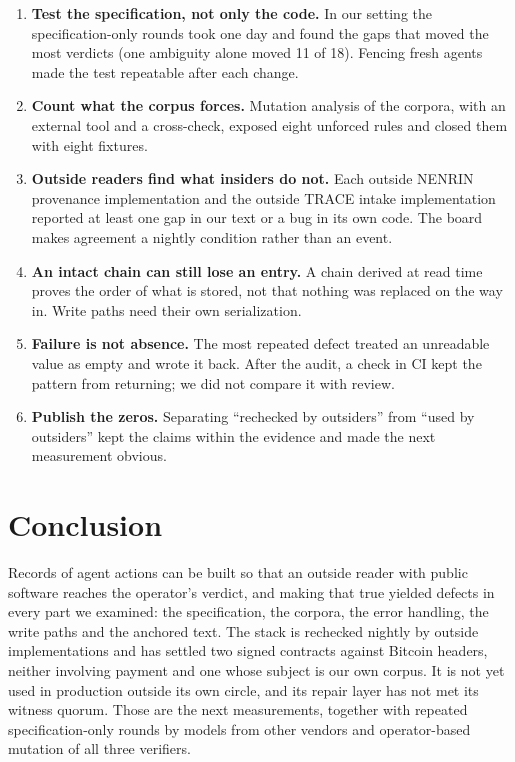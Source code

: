 \documentclass[11pt,a4paper]{article}
\begin{document}
\begin{enumerate}[label=L\arabic*.]
\item \textbf{Test the specification, not only the code.} In our setting the specification-only rounds took one day and found the gaps that moved the most verdicts (one ambiguity alone moved 11 of 18). Fencing fresh agents made the test repeatable after each change.
\item \textbf{Count what the corpus forces.} Mutation analysis of the corpora, with an external tool and a cross-check, exposed eight unforced rules and closed them with eight fixtures.
\item \textbf{Outside readers find what insiders do not.} Each outside NENRIN provenance implementation and the outside TRACE intake implementation reported at least one gap in our text or a bug in its own code. The board makes agreement a nightly condition rather than an event.
\item \textbf{An intact chain can still lose an entry.} A chain derived at read time proves the order of what is stored, not that nothing was replaced on the way in. Write paths need their own serialization.
\item \textbf{Failure is not absence.} The most repeated defect treated an unreadable value as empty and wrote it back. After the audit, a check in CI kept the pattern from returning; we did not compare it with review.
\item \textbf{Publish the zeros.} Separating ``rechecked by outsiders'' from ``used by outsiders'' kept the claims within the evidence and made the next measurement obvious.
\end{enumerate}

\section{Conclusion}

Records of agent actions can be built so that an outside reader with public software reaches the operator's verdict, and making that true yielded defects in every part we examined: the specification, the corpora, the error handling, the write paths and the anchored text. The stack is rechecked nightly by outside implementations and has settled two signed contracts against Bitcoin headers, neither involving payment and one whose subject is our own corpus. It is not yet used in production outside its own circle, and its repair layer has not met its witness quorum. Those are the next measurements, together with repeated specification-only rounds by models from other vendors and operator-based mutation of all three verifiers.
\end{document}
